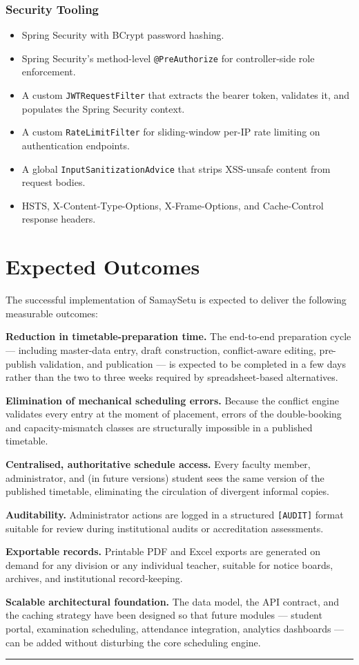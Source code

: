 \subsubsection{Security Tooling}
\begin{itemize}
    \item Spring Security with BCrypt password hashing.
    \item Spring Security's method-level \texttt{@PreAuthorize} for controller-side role enforcement.
    \item A custom \texttt{JWTRequestFilter} that extracts the bearer token, validates it, and populates the Spring Security context.
    \item A custom \texttt{RateLimitFilter} for sliding-window per-IP rate limiting on authentication endpoints.
    \item A global \texttt{InputSanitizationAdvice} that strips XSS-unsafe content from request bodies.
    \item HSTS, X-Content-Type-Options, X-Frame-Options, and Cache-Control response headers.
\end{itemize}

\section{Expected Outcomes}

The successful implementation of SamaySetu is expected to deliver the following measurable outcomes:

\textbf{Reduction in timetable-preparation time.} The end-to-end preparation cycle --- including master-data entry, draft construction, conflict-aware editing, pre-publish validation, and publication --- is expected to be completed in a few days rather than the two to three weeks required by spreadsheet-based alternatives.

\textbf{Elimination of mechanical scheduling errors.} Because the conflict engine validates every entry at the moment of placement, errors of the double-booking and capacity-mismatch classes are structurally impossible in a published timetable.

\textbf{Centralised, authoritative schedule access.} Every faculty member, administrator, and (in future versions) student sees the same version of the published timetable, eliminating the circulation of divergent informal copies.

\textbf{Auditability.} Administrator actions are logged in a structured \texttt{[AUDIT]} format suitable for review during institutional audits or accreditation assessments.

\textbf{Exportable records.} Printable PDF and Excel exports are generated on demand for any division or any individual teacher, suitable for notice boards, archives, and institutional record-keeping.

\textbf{Scalable architectural foundation.} The data model, the API contract, and the caching strategy have been designed so that future modules --- student portal, examination scheduling, attendance integration, analytics dashboards --- can be added without disturbing the core scheduling engine.

\vspace{3mm}
\hrule
